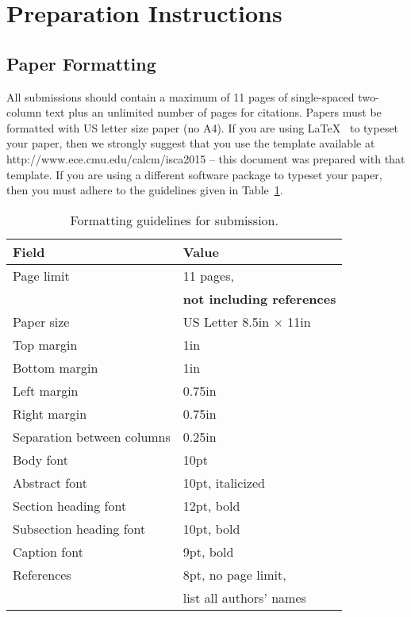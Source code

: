 \documentclass[pageno]{jpaper}
\begin{document}
\section{Preparation Instructions}

\subsection{Paper Formatting}

All submissions should contain a maximum of 11 pages of single-spaced
two-column text plus an unlimited number of pages for citations.
Papers must be formatted with US letter size paper (no A4).  If you
are using \LaTeX~\cite{lamport94} to typeset your paper, then we
strongly suggest that you use the template available at
http://www.ece.cmu.edu/calcm/isca2015 -- this document was prepared
with that template.  If you are using a different software package to
typeset your paper, then you must adhere to the guidelines given in
Table~\ref{table:formatting}.

\begin{table}[h!]
  \centering
  \begin{tabular}{|l|l|}
    \hline
    \textbf{Field} & \textbf{Value}\\
    \hline
    \hline
    Page limit & 11 pages, \\
               & {\bf not including references} \\
    \hline
    Paper size & US Letter 8.5in $\times$ 11in\\
    \hline
    Top margin & 1in\\
    \hline
    Bottom margin & 1in\\
    \hline
    Left margin & 0.75in\\
    \hline
    Right margin & 0.75in\\
    \hline
    Separation between columns & 0.25in\\
    \hline
    Body font & 10pt\\
    \hline
    Abstract font & 10pt, italicized\\
    \hline
    Section heading font & 12pt, bold\\
    \hline
    Subsection heading font & 10pt, bold\\
    \hline
    Caption font & 9pt, bold\\
    \hline
    References & 8pt, no page limit, \\
               & list all authors' names\\
    \hline
  \end{tabular}
  \caption{Formatting guidelines for submission. }
  \label{table:formatting}
\end{table}
\end{document}
